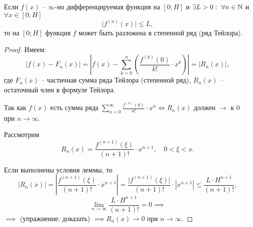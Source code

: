 \begin{lemma}
    Если $f(x)$ -- $\infty$-но дифференцируемая функция на $[0;H]$ и $\exists L > 0: \ \forall n \in \mathbb{N}$ и $\forall x \in [0;H]$
    \[
        \big|f^{(n)}(x)\big| \leqslant L,
    \]
    то на $[0;H]$ функция $f$ может быть разложена в степенной ряд (ряд Тейлора).
\end{lemma}

\begin{proof}
    Имеем:
    \[
        \big|f(x) - F_n(x)\big| = \left|f(x) - \sum_{k=0}^{n}\left(\frac{f^{(k)}(0)}{k!}\cdot x^k\right)\right| = \big|R_n(x)\big|,
    \]
    где $ F_n(x) $ -- частичная сумма ряда Тейлора (степенной ряд), $ R_n(x) $ -- остаточный член в формуле Тейлора.

    Так как $f(x)$ есть сумма ряда $\sum_{n=0}^{\infty}\frac{f^{(n)}(0)}{n!}\cdot x^n \iff R_n(x)$ должен $\rightarrow$ к $0$ при $n\rightarrow\infty$.

    Рассмотрим
    \[
        R_n(x) = \frac{f^{(n+1)}(\xi)}{(n+1)!} \cdot x^{n+1}, \quad 0 < \xi < x.
    \]

    Если выполнены условия леммы, то
    \[
        \big|R_n(x)\big| = \left|\frac{f^{(n+1)}(\xi)}{(n+1)!} \cdot x^{n+1}\right| = \frac{\big|f^{(n+1)}(\xi)\big|}{(n+1)!} \cdot |x^{n+1}| \leqslant \frac{L \cdot H^{n+1}}{(n+1)!},
    \]
    \[
        \underset{n\rightarrow\infty}{\lim}\frac{L\cdot H^{n+1}}{(n+1)!} = 0 \implies
    \]
    $ \implies $ (упражнение: доказать) $\implies R_n(x) \rightarrow 0$ при $n \rightarrow\infty$.
\end{proof}

